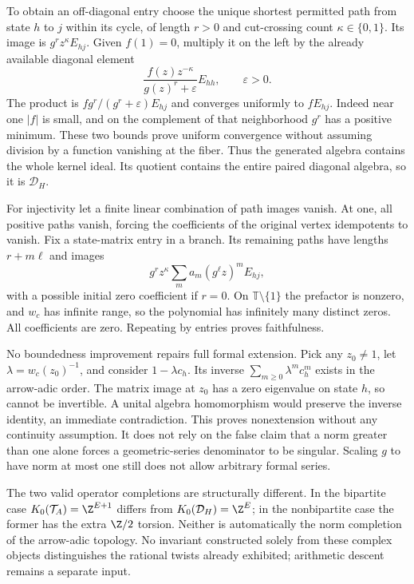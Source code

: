 \documentclass[11pt,oneside,openany]{book}
\theoremstyle{definition}\newtheorem{definition}[theorem]{Definition}
\theoremstyle{remark}\newtheorem{remark}[theorem]{Remark}
\begin{document}
To obtain an off-diagonal entry choose the unique shortest permitted path from state $h$ to $j$ within its cycle, of length $r>0$ and cut-crossing count $\kappa\in\{0,1\}$. Its image is $g^rz^\kappa E_{hj}$. Given $f(1)=0$, multiply it on the left by the already available diagonal element
\[
 \frac{f(z)z^{-\kappa}}{g(z)^r+\varepsilon}E_{hh},\qquad \varepsilon>0.
\]
The product is $f g^r/(g^r+\varepsilon)E_{hj}$ and converges uniformly to $fE_{hj}$. Indeed near one $|f|$ is small, and on the complement of that neighborhood $g^r$ has a positive minimum. These two bounds prove uniform convergence without assuming division by a function vanishing at the fiber. Thus the generated algebra contains the whole kernel ideal. Its quotient contains the entire paired diagonal algebra, so it is $\mathcal D_H$.

For injectivity let a finite linear combination of path images vanish. At one, all positive paths vanish, forcing the coefficients of the original vertex idempotents to vanish. Fix a state-matrix entry in a branch. Its remaining paths have lengths $r+m\ell$ and images
\[
 g^rz^\kappa\sum_m a_m(g^\ell z)^m E_{hj},
\]
with a possible initial zero coefficient if $r=0$. On $\mathbb T\setminus\{1\}$ the prefactor is nonzero, and $w_c$ has infinite range, so the polynomial has infinitely many distinct zeros. All coefficients are zero. Repeating by entries proves faithfulness.

No boundedness improvement repairs full formal extension. Pick any $z_0\ne1$, let $\lambda=w_c(z_0)^{-1}$, and consider $1-\lambda c_h$. Its inverse $\sum_{m\ge0}\lambda^m c_h^m$ exists in the arrow-adic order. The matrix image at $z_0$ has a zero eigenvalue on state $h$, so cannot be invertible. A unital algebra homomorphism would preserve the inverse identity, an immediate contradiction. This proves nonextension without any continuity assumption. It does not rely on the false claim that a norm greater than one alone forces a geometric-series denominator to be singular. Scaling $g$ to have norm at most one still does not allow arbitrary formal series.

The two valid operator completions are structurally different. In the bipartite case $K_0(\mathcal T_A)=\Z^{E+1}$ differs from $K_0(\mathcal D_H)=\Z^E$; in the nonbipartite case the former has the extra $\Z/2$ torsion. Neither is automatically the norm completion of the arrow-adic topology. No invariant constructed solely from these complex objects distinguishes the rational twists already exhibited; arithmetic descent remains a separate input.
\end{document}
